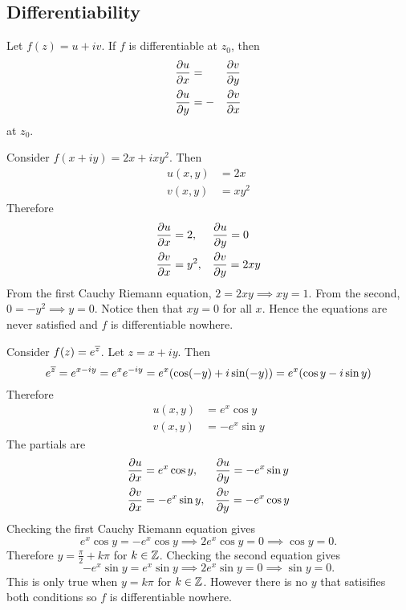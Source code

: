 \documentclass[../notes.tex]{subfiles}
\begin{document}
\subsection{Differentiability}

\begin{theorem}
    \label{thm:cauchyriemann}
    Let $f(z) = u + iv$. If $f$ is differentiable at $z_0$, then
    \begin{alignat*}{2}
        \pdv{u}{x} &= &&\pdv{v}{y} \\
        \pdv{u}{y} &= -&&\pdv{v}{x}
    \end{alignat*}
    at $z_0$.
\end{theorem}

\begin{example}
    Consider $f(x+iy) = 2x + ixy^2$. Then
    \begin{align*}
        u(x,y) &= 2x \\
        v(x,y) &= xy^2
    \end{align*}
    Therefore
    \begin{alignat*}{2}
        \pdv{u}{x} &= 2, &&\pdv{u}{y} = 0 \\
        \pdv{v}{x} &= y^2, &&\pdv{v}{y} = 2xy
    \end{alignat*}
    From the first Cauchy Riemann equation, $2 = 2xy \implies xy = 1$. From the second, $0 = -y^2 \implies y = 0$. Notice then that $xy = 0$ for all $x$. Hence the equations are never satisfied and $f$ is differentiable nowhere.
\end{example}

\begin{example}
    Consider $f(z) = e^{\overline{z}}$. Let $z = x + iy$. Then
    \[
        e^{\overline{z}} = e^{x - iy} = e^x e^{-iy} = e^x (\cos (-y) + i \sin (-y)) = e^x (\cos y - i \sin y)
    \]
    Therefore
    \begin{align*}
        u(x,y) &= e^x \cos y \\
        v(x,y) &= -e^x \sin y
    \end{align*}
    The partials are
    \begin{alignat*}{2}
        \pdv{u}{x} &= e^x \cos y, &&\pdv{u}{y} = -e^x\sin y \\
        \pdv{v}{x} &= -e^x \sin y, &&\pdv{v}{y} = -e^x \cos y
    \end{alignat*}
    Checking the first Cauchy Riemann equation gives
    \[
        e^x \cos y = -e^x \cos y \implies 2e^x \cos y = 0 \implies \cos y = 0
    .\]
    Therefore $y = \frac{\pi}{2} + k \pi$ for $k \in \mathbb{Z}$. Checking the second equation gives
    \[
        -e^x \sin y = e^x \sin y \implies 2e^x \sin y = 0 \implies \sin y = 0
    .\]
    This is only true when $y = k \pi$ for $k \in \mathbb{Z}$. However there is no $y$ that satisifies both conditions so $f$ is differentiable nowhere.
\end{example}
\end{document}
